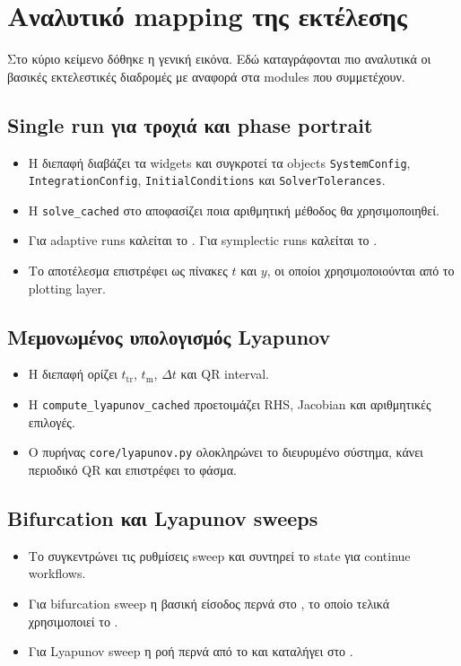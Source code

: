 \clearpage
\section{Αναλυτικό mapping της εκτέλεσης}
\label{app:ch2-execution-map}

Στο κύριο κείμενο δόθηκε η γενική εικόνα. Εδώ καταγράφονται πιο αναλυτικά οι
βασικές εκτελεστικές διαδρομές με αναφορά στα modules που συμμετέχουν.

\subsection*{Single run για τροχιά και phase portrait}
\begin{itemize}
\item Η διεπαφή διαβάζει τα widgets και συγκροτεί τα objects
\texttt{SystemConfig}, \texttt{IntegrationConfig}, \texttt{InitialConditions}
και \texttt{SolverTolerances}.
\item Η \texttt{solve\_cached} στο  αποφασίζει ποια
αριθμητική μέθοδος θα χρησιμοποιηθεί.
\item Για adaptive runs καλείται το . Για
symplectic runs καλείται το .
\item Το αποτέλεσμα επιστρέφει ως πίνακες \(t\) και \(y\), οι οποίοι
χρησιμοποιούνται από το plotting layer.
\end{itemize}

\subsection*{Μεμονωμένος υπολογισμός Lyapunov}
\begin{itemize}
\item Η διεπαφή ορίζει \(t_{\mathrm{tr}}\), \(t_{\mathrm{m}}\),
\(\Delta t\) και QR interval.
\item Η \texttt{compute\_lyapunov\_cached} προετοιμάζει RHS, Jacobian και
αριθμητικές επιλογές.
\item Ο πυρήνας \texttt{core/lyapunov.py} ολοκληρώνει το διευρυμένο σύστημα,
κάνει περιοδικό QR και επιστρέφει το φάσμα.
\end{itemize}

\subsection*{Bifurcation και Lyapunov sweeps}
\begin{itemize}
\item Το  συγκεντρώνει τις ρυθμίσεις sweep
και συντηρεί το state για continue workflows.
\item Για bifurcation sweep η βασική είσοδος περνά στο ,
το οποίο τελικά χρησιμοποιεί το .
\item Για Lyapunov sweep η ροή περνά από το
 και καταλήγει στο
.
\end{itemize}

